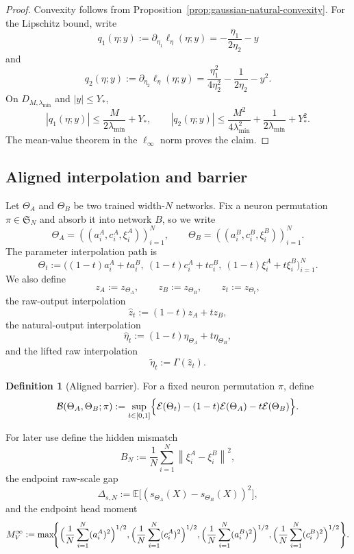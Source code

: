 \documentclass[11pt]{article}
\theoremstyle{definition}
\newtheorem{definition}[theorem]{Definition}
\newcommand{\E}{\mathbb{E}}
\newcommand{\norm}[1]{\left\lVert #1 \right\rVert}
\newcommand{\cE}{\mathcal{E}}
\newcommand{\cB}{\mathcal{B}}
\begin{document}
\begin{proof}
Convexity follows from Proposition~\ref{prop:gaussian-natural-convexity}.
For the Lipschitz bound, write
\[
  q_1(\eta;y)
  :=
  \partial_{\eta_1}\ell_\eta(\eta;y)
  =
  -\frac{\eta_1}{2\eta_2}-y
\]
and
\[
  q_2(\eta;y)
  :=
  \partial_{\eta_2}\ell_\eta(\eta;y)
  =
  \frac{\eta_1^2}{4\eta_2^2}
  -
  \frac{1}{2\eta_2}
  -
  y^2.
\]
On $D_{M,\lambda_{\min}}$ and $|y|\le Y_\ast$,
\[
  |q_1(\eta;y)|
  \le
  \frac{M}{2\lambda_{\min}}+Y_\ast,
  \qquad
  |q_2(\eta;y)|
  \le
  \frac{M^2}{4\lambda_{\min}^2}
  +
  \frac{1}{2\lambda_{\min}}
  +
  Y_\ast^2.
\]
The mean-value theorem in the $\ell_\infty$ norm proves the claim.
\end{proof}

\subsection{Aligned interpolation and barrier}

Let $\Theta_A$ and $\Theta_B$ be two trained width-$N$ networks. Fix a neuron
permutation $\pi\in\mathfrak S_N$ and absorb it into network $B$, so we write
\[
  \Theta_A=((a_i^A,c_i^A,\xi_i^A))_{i=1}^N,
  \qquad
  \Theta_B=((a_i^B,c_i^B,\xi_i^B))_{i=1}^N.
\]
The parameter interpolation path is
\[
  \Theta_t
  :=
  \bigl((1-t)a_i^A+ta_i^B,\ (1-t)c_i^A+tc_i^B,\ (1-t)\xi_i^A+t\xi_i^B\bigr)_{i=1}^N.
\]
We also define
\[
  z_A:=z_{\Theta_A},
  \qquad
  z_B:=z_{\Theta_B},
  \qquad
  z_t:=z_{\Theta_t},
\]
the raw-output interpolation
\[
  \hat z_t:=(1-t)z_A+tz_B,
\]
the natural-output interpolation
\[
  \hat\eta_t:=(1-t)\eta_{\Theta_A}+t\eta_{\Theta_B},
\]
and the lifted raw interpolation
\[
  \tilde\eta_t:=\Gamma(\hat z_t).
\]

\begin{definition}[Aligned barrier]
For a fixed neuron permutation $\pi$, define
\[
  \cB(\Theta_A,\Theta_B;\pi)
  :=
  \sup_{t\in[0,1]}
  \Bigl\{
    \cE(\Theta_t)
    -
    (1-t)\cE(\Theta_A)
    -
    t\cE(\Theta_B)
  \Bigr\}.
\]
\end{definition}

For later use define the hidden mismatch
\begin{equation}
  B_N
  :=
  \frac1N\sum_{i=1}^N \norm{\xi_i^A-\xi_i^B}^2,
  \label{eq:hidden_mismatch_k1}
\end{equation}
the endpoint raw-scale gap
\begin{equation}
  \Delta_{s,N}
  :=
  \E\big[(s_{\Theta_A}(X)-s_{\Theta_B}(X))^2\big],
  \label{eq:raw_scale_gap}
\end{equation}
and the endpoint head moment
\begin{equation}
  M_V^\infty
  :=
  \max\!\Biggl\{
    \Bigl(\frac1N\sum_{i=1}^N (a_i^A)^2\Bigr)^{1/2},
    \Bigl(\frac1N\sum_{i=1}^N (c_i^A)^2\Bigr)^{1/2},
    \Bigl(\frac1N\sum_{i=1}^N (a_i^B)^2\Bigr)^{1/2},
    \Bigl(\frac1N\sum_{i=1}^N (c_i^B)^2\Bigr)^{1/2}
  \Biggr\}.
  \label{eq:head_moment_k1}
\end{equation}
\end{document}
